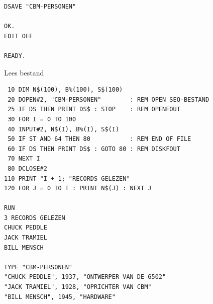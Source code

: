 \begin{description}[leftmargin=2cm,style=nextline]
\begin{tcolorbox}[colback=black,coltext=white]
\begin{verbatim}
DSAVE "CBM-PERSONEN"

OK.
EDIT OFF

READY.
\end{verbatim}
\end{tcolorbox}

                  Lees bestand

\begin{tcolorbox}[colback=black,coltext=white]
\verbatimfont{\codefont}
\begin{verbatim}
 10 DIM N$(100), B%(100), S$(100)
 20 DOPEN#2, "CBM-PERSONEN"        : REM OPEN SEQ-BESTAND
 25 IF DS THEN PRINT DS$ : STOP    : REM OPENFOUT
 30 FOR I = 0 TO 100
 40 INPUT#2, N$(I), B%(I), S$(I)
 50 IF ST AND 64 THEN 80           : REM END OF FILE
 60 IF DS THEN PRINT DS$ : GOTO 80 : REM DISKFOUT
 70 NEXT I
 80 DCLOSE#2
110 PRINT "I + 1; "RECORDS GELEZEN"
120 FOR J = 0 TO I : PRINT N$(J) : NEXT J

RUN
3 RECORDS GELEZEN
CHUCK PEDDLE
JACK TRAMIEL
BILL MENSCH

TYPE "CBM-PERSONEN"
"CHUCK PEDDLE", 1937, "ONTWERPER VAN DE 6502"
"JACK TRAMIEL", 1928, "OPRICHTER VAN CBM"
"BILL MENSCH", 1945, "HARDWARE"
\end{verbatim}
\end{tcolorbox}
\end{description}


\newpage
